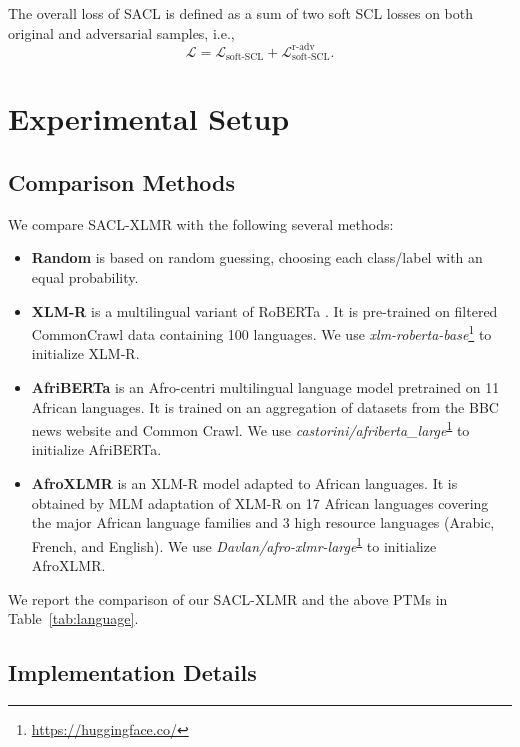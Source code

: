 \documentclass[11pt]{article}
\begin{document}
The overall loss of SACL is defined as a sum of two soft SCL losses on both original and adversarial samples, i.e.,
\begin{equation}
     \mathcal{L} = \mathcal{L}_{\text{soft-SCL}} + \mathcal{L}_{\text{soft-SCL}}^{\text{r-adv}}. 
\end{equation}


\section{Experimental Setup}
\subsection{Comparison Methods}
We compare SACL-XLMR with the following several methods:
\begin{itemize}
    \item \textbf{Random} is based on random guessing, choosing each class/label with an equal probability.
    \item \textbf{XLM-R} \citep{DBLP:conf/nips/ConneauL19} is a multilingual variant of RoBERTa \citep{DBLP:journals/corr/abs-1907-11692}. It is pre-trained on filtered CommonCrawl data containing 100 languages.
    We use \textit{xlm-roberta-base}\footnote{\url{https://huggingface.co/}\label{code}} to initialize XLM-R. 
    \item \textbf{AfriBERTa} \citep{ogueji-etal-2021-small} is an Afro-centri multilingual language model pretrained on 11 African languages. 
    It is trained on an aggregation of datasets from the BBC news website and Common Crawl.
    We use \textit{castorini/afriberta\_large}\textsuperscript{\ref{code}} to initialize AfriBERTa. 
    \item \textbf{AfroXLMR} \citep{DBLP:conf/coling/AlabiAMK22} is an XLM-R model adapted to African languages. It is obtained by MLM adaptation of XLM-R on 17 African languages covering the major African language families and 3 high resource languages (Arabic, French, and English). 
    We use \textit{Davlan/afro-xlmr-large}\textsuperscript{\ref{code}} to initialize AfroXLMR. 
\end{itemize}

We report the comparison of our SACL-XLMR and the above PTMs in Table~\ref{tab:language}.


\subsection{Implementation Details}
\end{document}
